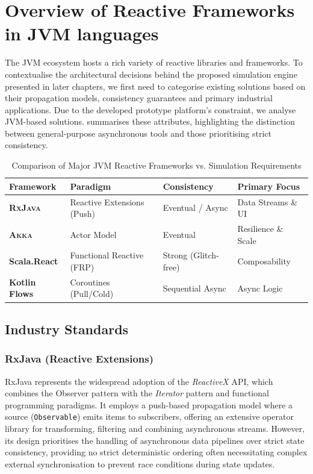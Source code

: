 \section{Overview of Reactive Frameworks in JVM languages}

The \ac{JVM} ecosystem hosts a rich variety of reactive libraries and
frameworks. To contextualise the architectural decisions behind the proposed
simulation engine presented in later chapters, we first need to categorise
existing solutions based on their propagation models, consistency guarantees
and primary industrial applications. Due to the developed prototype platform's
constraint, we analyse JVM-based solutions.
 summarises these attributes,
highlighting the distinction between general-purpose asynchronous tools and
those prioritising strict consistency.

\begin{table}[ht]
	\centering
	\renewcommand{\arraystretch}{1.2}
	\begin{tabularx}{\textwidth}{@{} l X l X @{}}
		\toprule
		\textbf{Framework}       & \textbf{Paradigm}          & \textbf{Consistency} & \textbf{Primary Focus} \\
		\midrule
		\midrule
		\textbf{\textsc{RxJava}} & Reactive Extensions (Push) & Eventual / Async     & Data Streams \& UI     \\
		\midrule
		\textbf{\textsc{Akka}}   & Actor Model                & Eventual             & Resilience \& Scale    \\
		\midrule
		\textbf{Scala.React}     & Functional Reactive (FRP)  & Strong (Glitch-free) & Composability          \\
		\midrule
		\textbf{Kotlin Flows}    & Coroutines (Pull/Cold)     & Sequential Async     & Async Logic            \\
		\bottomrule
	\end{tabularx}
	\caption{Comparison of Major JVM Reactive Frameworks vs. Simulation Requirements}
	\label{tab:reactive_frameworks_comparison}
\end{table}

\subsection{Industry Standards}

\subsubsection{RxJava (Reactive Extensions)}
RxJava represents the widespread adoption of the \emph{ReactiveX} \ac{API},
which combines the Observer pattern with the \emph{Iterator} pattern and
functional programming paradigms. It employs a push-based propagation model
where a source (\texttt{Observable}) emits items to subscribers, offering an
extensive operator library for transforming, filtering and combining
asynchronous streams. However, its design prioritises the handling of
asynchronous data pipelines over strict state consistency, providing no strict
deterministic ordering often necessitating complex external synchronisation to
prevent race conditions during state updates.

